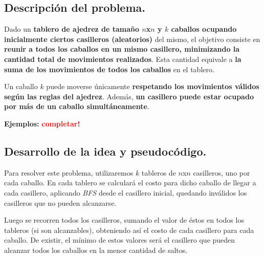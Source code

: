 \subsection{Descripción del problema.}

\vspace*{0.3cm}

Dado un \textbf{tablero de ajedrez de tamaño $n$x$n$ y $k$ caballos ocupando 
inicialmente ciertos casilleros (aleatorios)} del mismo, el objetivo consiste 
en \textbf{reunir a todos los caballos en un mismo casillero, minimizando la 
cantidad total de movimientos realizados}. Esta cantidad equivale a 
\textbf{la suma de los movimientos de todos los caballos} en el tablero. 

Un caballo $k$ puede moverse únicamente \textbf{respetando los movimientos 
válidos según las reglas del ajedrez}. Además, \textbf{un casillero puede 
estar ocupado por más de un caballo simultáneamente}.

\vspace*{0.5cm}

\textbf{Ejemplos:}
  \textcolor{red}{\textbf{completar!}}



\newpage
\subsection{Desarrollo de la idea y pseudocódigo.}

\vspace*{0.3cm}


Para resolver este problema, utilizaremos $k$ tableros de $n$x$n$ casilleros, 
uno por cada caballo. En cada tablero se calculará el costo para dicho caballo 
de llegar a cada casillero, aplicando \textit{BFS} desde el casillero inicial, 
quedando inválidos los casilleros que no pueden alcanzarse.

Luego se recorren todos los casilleros, sumando el valor de éstos en todos los 
tableros (si son alcanzables), obteniendo así el costo de cada casillero para 
cada caballo. De existir, el mínimo de estos valores será el casillero que 
pueden alcanzar todos los caballos en la menor cantidad de saltos.

